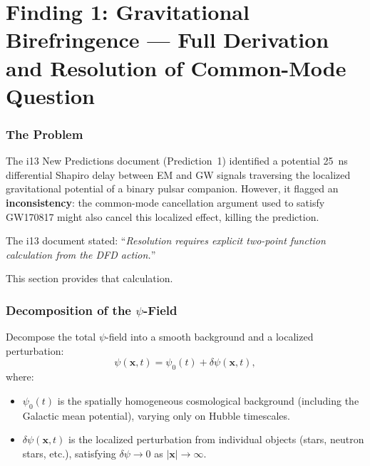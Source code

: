 \documentclass[11pt]{article}
\begin{document}
\part{Finding 1: Gravitational Birefringence --- Full Derivation and
Resolution of Common-Mode Question}
\label{part:birefringence}

\section{The Problem}

The i13 New Predictions document (Prediction~1) identified a potential
25~ns differential Shapiro delay between EM and GW signals traversing
the localized gravitational potential of a binary pulsar companion.
However, it flagged an \textbf{inconsistency}: the common-mode
cancellation argument used to satisfy GW170817 might also cancel this
localized effect, killing the prediction.

The i13 document stated: ``\textit{Resolution requires explicit
two-point function calculation from the DFD action.}''

This section provides that calculation.

\section{Decomposition of the $\psi$-Field}

Decompose the total $\psi$-field into a smooth background and a
localized perturbation:
\begin{equation}\label{eq:psi-decomp}
\psi(\mathbf{x}, t) = \psi_0(t) + \delta\psi(\mathbf{x}, t),
\end{equation}
where:
\begin{itemize}[nosep]
\item $\psi_0(t)$ is the spatially homogeneous cosmological background
  (including the Galactic mean potential), varying only on Hubble
  timescales.
\item $\delta\psi(\mathbf{x}, t)$ is the localized perturbation from
  individual objects (stars, neutron stars, etc.), satisfying
  $\delta\psi \to 0$ as $|\mathbf{x}| \to \infty$.
\end{itemize}
\end{document}
